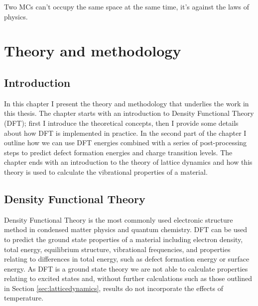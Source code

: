 \begin{savequote}[8cm]
Two MCs can't occupy the same space at the same time,
it's against the laws of physics.
\end{savequote}

\chapter{\label{ch:3-methods}Theory and methodology}

\minitoc



\section{Introduction} 

In this chapter I present the theory and methodology that underlies the work in this thesis. The chapter starts with an introduction to Density Functional Theory (DFT); first I introduce the theoretical concepts, then I provide some details about how DFT is implemented in practice. In the second part of the chapter I outline how we can use DFT energies combined with a series of post-processing steps to predict defect formation energies and charge transition levels. The chapter ends with an introduction to the theory of lattice dynamics and how this theory is used to calculate the vibrational properties of a material. 

\section{Density Functional Theory} \label{DFTtheory}

Density Functional Theory is the most commonly used electronic structure method in condensed matter physics and quantum chemistry. 
DFT can be used to predict the ground state properties of a material including electron density, total energy, equilibrium structure, vibrational frequencies, and properties relating to differences in total energy, such as defect formation energy or surface energy. 
As DFT is a ground state theory we are not able to calculate properties relating to excited states and, without further calculations such as those outlined in Section \ref{sec:latticedynamics}, results do not incorporate the effects of temperature. 

